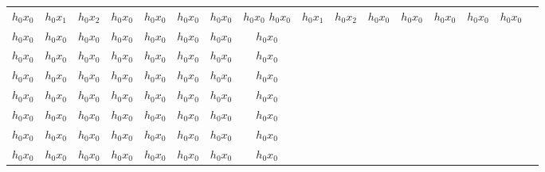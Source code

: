 \documentclass{article}
\begin{document}
\begin{center}
\begin{tabular}{ |c|c|c|c|c|c|c|c|c|c|c|c|c|c|c|c| } 
 \hline
 $h_0x_0$ & $h_0x_1$ & $h_0x_2$ & $h_0x_0$ & $h_0x_0$ & $h_0x_0$ & $h_0x_0$ & $h_0x_0$
 $h_0x_0$ & $h_0x_1$ & $h_0x_2$ & $h_0x_0$ & $h_0x_0$ & $h_0x_0$ & $h_0x_0$ & $h_0x_0$\\ 
 $h_0x_0$ & $h_0x_0$ & $h_0x_0$ & $h_0x_0$ & $h_0x_0$ & $h_0x_0$ & $h_0x_0$ & $h_0x_0$\\ 
 $h_0x_0$ & $h_0x_0$ & $h_0x_0$ & $h_0x_0$ & $h_0x_0$ & $h_0x_0$ & $h_0x_0$ & $h_0x_0$\\ 
 $h_0x_0$ & $h_0x_0$ & $h_0x_0$ & $h_0x_0$ & $h_0x_0$ & $h_0x_0$ & $h_0x_0$ & $h_0x_0$\\ 
 $h_0x_0$ & $h_0x_0$ & $h_0x_0$ & $h_0x_0$ & $h_0x_0$ & $h_0x_0$ & $h_0x_0$ & $h_0x_0$\\ 
 $h_0x_0$ & $h_0x_0$ & $h_0x_0$ & $h_0x_0$ & $h_0x_0$ & $h_0x_0$ & $h_0x_0$ & $h_0x_0$\\ 
 $h_0x_0$ & $h_0x_0$ & $h_0x_0$ & $h_0x_0$ & $h_0x_0$ & $h_0x_0$ & $h_0x_0$ & $h_0x_0$\\ 
 $h_0x_0$ & $h_0x_0$ & $h_0x_0$ & $h_0x_0$ & $h_0x_0$ & $h_0x_0$ & $h_0x_0$ & $h_0x_0$\\ 
 \hline
\end{tabular}
\end{center}
\end{document}
